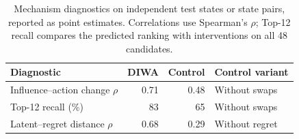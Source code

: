 \begin{table}[t]
\centering
\caption{Mechanism diagnostics on independent test states or state pairs, reported as point estimates. Correlations use Spearman's $\rho$; Top-12 recall compares the predicted ranking with interventions on all 48 candidates.}
\label{tab:mechanisms}
\small
\begin{tabular}{lrrl}
\toprule
Diagnostic & DIWA & Control & Control variant\\
\midrule
Influence--action change $\rho$ & 0.71 & 0.48 & Without swaps\\
Top-12 recall (\%) & 83 & 65 & Without swaps\\
Latent--regret distance $\rho$ & 0.68 & 0.29 & Without regret\\
\bottomrule
\end{tabular}
\end{table}
